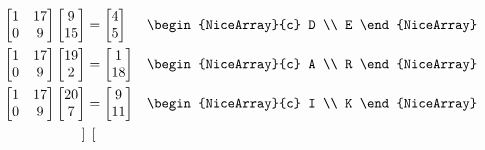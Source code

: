\begin{examplebox}{}{}
    $$\begin{aligned}
        \begin{bmatrix}
            1 & 17 \\
            0 & 9
        \end{bmatrix} \begin{bmatrix}
            9 \\
            15
        \end{bmatrix} & = \begin{bmatrix}
            4 \\
            5
        \end{bmatrix} & & \begin{NiceArray}{c}
            D \\
            E
        \end{NiceArray} \\
        \begin{bmatrix}
            1 & 17 \\
            0 & 9
        \end{bmatrix} \begin{bmatrix}
            19 \\
            2
        \end{bmatrix} & = \begin{bmatrix}
            1 \\
            18
        \end{bmatrix} & & \begin{NiceArray}{c}
            A \\
            R
        \end{NiceArray} \\
        \begin{bmatrix}
            1 & 17 \\
            0 & 9
        \end{bmatrix} \begin{bmatrix}
            20 \\
            7
        \end{bmatrix} & = \begin{bmatrix}
            9 \\
            11
        \end{bmatrix} & & \begin{NiceArray}{c}
            I \\
            K
        \end{NiceArray} \\
        \begin{bmatrix}

\end{bmatrix}
\end{aligned}$$
\end{examplebox}
